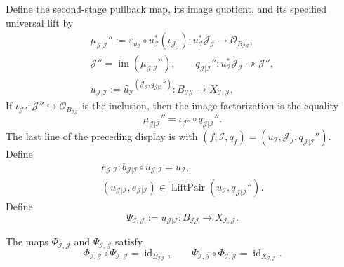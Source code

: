 \begin{definition}
\[  \]
  Define the second-stage pullback map, its image quotient, and its specified
  universal lift by
  \[
  \begin{gathered}
    \mu_{\mathcal J|\mathcal I}'':=
      \varepsilon_{u_{\mathcal I}}\circ
        u_{\mathcal I}^*(\iota_{\mathcal J_{\mathcal I}})\colon
      u_{\mathcal I}^*\mathcal J_{\mathcal I}
        \longrightarrow\mathcal O_{B_{\mathcal I\mathcal J}},\\
    \mathcal J''=
      \operatorname{im}(\mu_{\mathcal J|\mathcal I}''),
    \qquad
    q_{\mathcal J|\mathcal I}''\colon
      u_{\mathcal I}^*\mathcal J_{\mathcal I}
        \twoheadrightarrow\mathcal J'',\\
    u_{\mathcal J|\mathcal I}:=
      \widetilde{u_{\mathcal I}}^{
        (\mathcal J_{\mathcal I},q_{\mathcal J|\mathcal I}'')}
      \colon B_{\mathcal I\mathcal J}\longrightarrow
        X_{\mathcal I,\mathcal J},
  \end{gathered}
  \]
  If
  $\iota_{\mathcal J''}\colon\mathcal J''\hookrightarrow
  \mathcal O_{B_{\mathcal I\mathcal J}}$ is the inclusion, then the image
  factorization is the equality
  \[
    \mu_{\mathcal J|\mathcal I}''
      =\iota_{\mathcal J''}\circ q_{\mathcal J|\mathcal I}''. \tag{PCc}
  \]
  The last line of the preceding display is
   with
  $(f,\mathcal I,q_f)=(u_{\mathcal I},\mathcal J_{\mathcal I},
  q_{\mathcal J|\mathcal I}'')$.  Define
  \[
  \begin{gathered}
    e_{\mathcal J|\mathcal I}\colon
      b_{\mathcal J|\mathcal I}\circ u_{\mathcal J|\mathcal I}
        =u_{\mathcal I},\\
    (u_{\mathcal J|\mathcal I},e_{\mathcal J|\mathcal I})
      \in\operatorname{LiftPair}
        (u_{\mathcal I},q_{\mathcal J|\mathcal I}'').
  \end{gathered}                                             \tag{BPC1}
  \]
  Define
  \[
    \Psi_{\mathcal I,\mathcal J}:=
      u_{\mathcal J|\mathcal I}\colon
      B_{\mathcal I\mathcal J}\longrightarrow X_{\mathcal I,\mathcal J}.
  \]
\end{definition}

\begin{theorem}
  \label{thm:nagata-blowup-product-ideal}

  The maps $\Phi_{\mathcal I,\mathcal J}$ and
  $\Psi_{\mathcal I,\mathcal J}$ satisfy
  \[
    \Phi_{\mathcal I,\mathcal J}\circ\Psi_{\mathcal I,\mathcal J}
      =\operatorname{id}_{B_{\mathcal I\mathcal J}},
    \qquad
    \Psi_{\mathcal I,\mathcal J}\circ\Phi_{\mathcal I,\mathcal J}
      =\operatorname{id}_{X_{\mathcal I,\mathcal J}}.
  \]
\end{theorem}

